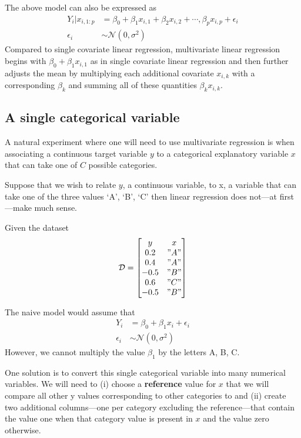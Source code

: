 The above model can also be expressed as 
\begin{align}
    Y_{i} | x_{i,1:p} &=  \beta_{0} + \beta_{1}x_{i,1} + \beta_{2}x_{i,2} + \cdots, \beta_{p}x_{i,p} + \epsilon_{i} \\ 
    \epsilon_{i} &\sim \mathcal{N}(0,\sigma^{2})
\end{align}
Compared to single covariate linear regression, multivariate linear regression begins with $\beta_{0} + \beta_{1}x_{i,1}$ as in single covariate linear regression and then further adjusts the mean by multiplying each additional covariate $x_{i,k}$ with a corresponding $\beta_{k}$ and summing all of these quantities $\beta_{k}x_{i,k}$.

\subsection{A single categorical variable}

A natural experiment where one will need to use multivariate regression is when associating a continuous target variable $y$ to a categorical explanatory variable $x$ that can take one of $C$ possible categories.

Suppose that we wish to relate $y$, a continuous variable, to x, a variable that can take one of the three values `A', `B', `C' then linear regression does not---at first---make much sense. 

Given the dataset 
\begin{align}
\mathcal{D} = \begin{bmatrix}
        y & x \\
        0.2  & "A"\\
        0.4  & "A"\\
        -0.5 & "B"\\
        0.6  & "C"\\
        -0.5 & "B"
              \end{bmatrix}
\end{align}

The naive model would assume that 
\begin{align}
    Y_{i} &= \beta_{0} + \beta_{1} x_{i} + \epsilon_{i} \\
    \epsilon_{i} &\sim \mathcal{N}(0,\sigma^{2})     
\end{align}
However, we cannot multiply the value $\beta_{1}$ by the letters A, B, C.

One solution is to convert this single categorical variable into many numerical variables.
We will need to (i) choose a \textbf{reference} value for $x$ that we will compare all other y values corresponding to other categories to and (ii) create two additional columns---one per category excluding the reference---that contain the value one when that category value is present in $x$ and the value zero otherwise.  

